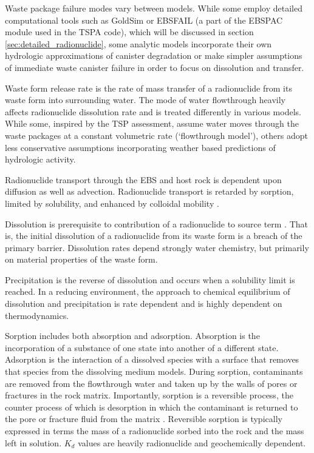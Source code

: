 Waste package failure modes vary between models. While some employ detailed 
computational tools such as GoldSim or EBSFAIL (a part of the EBSPAC module 
used in the TSPA code), which will be discussed in section 
\ref{sec:detailed_radionuclide}, some 
analytic models incorporate their own hydrologic approximations of
canister degradation or make simpler assumptions of immediate waste canister 
failure in order to focus on dissolution and transfer. 

Waste form release rate is the rate of mass transfer of a radionuclide from its
waste form into surrounding water. The mode of water flowthrough heavily
affects radionuclide dissolution rate and is treated differently in various models.
While some, inspired by the TSP assessment, assume water moves through the
waste packages at a constant volumetric rate (`flowthrough model'), others
adopt less conservative assumptions incorporating weather based predictions of
hydrologic activity.

Radionuclide transport through the \gls{EBS} and host rock is dependent upon 
diffusion as well as advection. Radionuclide transport is retarded by sorption,
limited by solubility, and enhanced by colloidal mobility 
\cite{bracke_safety_2008}. 

Dissolution is prerequisite to contribution of a radionuclide to source term 
\cite{bracke_safety_2008}. That is, the initial dissolution of a radionuclide 
from its waste form is a breach of the primary barrier. Dissolution rates 
depend strongly water chemistry, but primarily on material properties of the 
waste form.

Precipitation is the reverse of dissolution and occurs when a solubility limit
is reached. In a reducing environment, the approach to chemical equilibrium of 
dissolution and precipitation is rate dependent and is highly dependent on 
thermodynamics.

Sorption includes both absorption and adsorption. Absorption is the 
incorporation of a substance of one state into another of a different state.
Adsorption is the interaction of a dissolved species with a surface that
removes that species from the dissolving medium models. During sorption, 
contaminants are removed from the flowthrough water and taken up by the 
walls of pores or fractures in the rock matrix.  Importantly, sorption is a 
reversible process, the  counter process of which is desorption in which the 
contaminant is returned to the pore or fracture fluid from the matrix
\cite{ahn_mass_1988} . Reversible sorption is typically expressed in terms 
the mass of a radionuclide sorbed into the rock and the mass left in solution. 
$K_d$ values are heavily radionuclide and geochemically dependent.  

